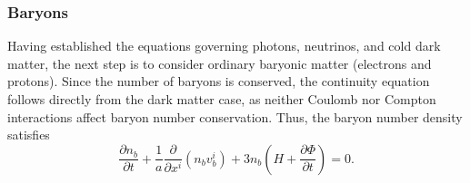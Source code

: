 \documentclass{aa}
\numberwithin{equation}{section}
\numberwithin{table}{section}
\numberwithin{figure}{section}
\begin{document}
\subsubsection{Baryons}
Having established the equations governing photons, neutrinos, and cold dark matter, the next step is to consider ordinary baryonic matter (electrons and protons). 
Since the number of baryons is conserved, the continuity equation follows directly from the dark matter case, as neither Coulomb nor Compton interactions affect baryon number conservation. Thus, the baryon number density satisfies
\begin{equation}
    \frac{\partial n_b}{\partial t} + \frac{1}{a} \frac{\partial}{\partial x^i} \left(n_b v_b^i\right) + 3n_b \left( H + \frac{\partial \Phi}{\partial t} \right) = 0.
\end{equation}
\end{document}
